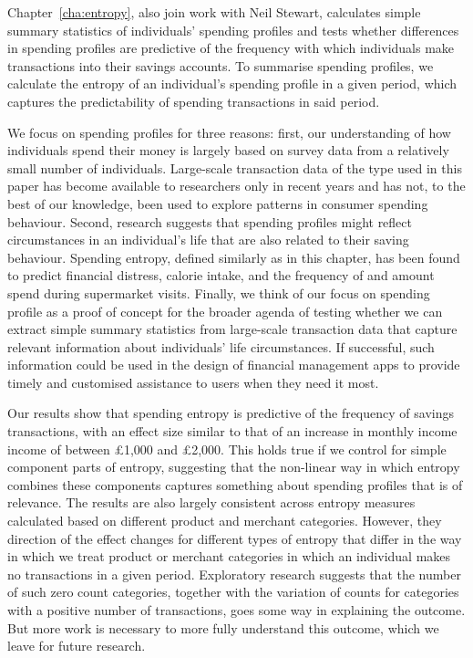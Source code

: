 Chapter~\ref{cha:entropy}, also join work with Neil Stewart, calculates simple
summary statistics of individuals' spending profiles and tests whether
differences in spending profiles are predictive of the frequency with which
individuals make transactions into their savings accounts. To summarise
spending profiles, we calculate the entropy of an individual's spending profile
in a given period, which captures the predictability of spending transactions
in said period.

We focus on spending profiles for three reasons: first, our understanding of
how individuals spend their money is largely based on survey data from a
relatively small number of individuals. Large-scale transaction data of the
type used in this paper has become available to researchers only in recent
years and has not, to the best of our knowledge, been used to explore patterns
in consumer spending behaviour. Second, research suggests that spending
profiles might reflect circumstances in an individual's life that are also
related to their saving behaviour. Spending entropy, defined similarly as in
this chapter, has been found to predict financial distress, calorie intake, and
the frequency of and amount spend during supermarket visits. Finally, we think
of our focus on spending profile as a proof of concept for the broader agenda
of testing whether we can extract simple summary statistics from large-scale
transaction data that capture relevant information about individuals' life
circumstances. If successful, such information could be used in the design of
financial management apps to provide timely and customised assistance to users
when they need it most.

Our results show that spending entropy is predictive of the frequency of
savings transactions, with an effect size similar to that of an increase in
monthly income income of between \pounds1,000 and \pounds2,000. This holds true
if we control for simple component parts of entropy, suggesting that the
non-linear way in which entropy combines these components captures something
about spending profiles that is of relevance. The results are also largely
consistent across entropy measures calculated based on different product and
merchant categories. However, they direction of the effect changes for
different types of entropy that differ in the way in which we treat product or
merchant categories in which an individual makes no transactions in a given
period. Exploratory research suggests that the number of such zero count
categories, together with the variation of counts for categories with a
positive number of transactions, goes some way in explaining the outcome. But
more work is necessary to more fully understand this outcome, which we leave
for future research.

